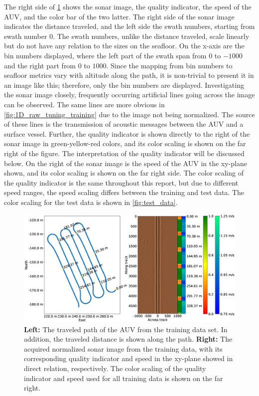 The right side of \cref{fig:path_sonar_colorbars} shows the sonar image, the quality indicator, the speed of the AUV, and the color bar of the two latter. The right side of the sonar image indicates the distance traveled, and the left side the swath numbers, starting from swath number $0$. The swath numbers, unlike the distance traveled, scale linearly but do not have any relation to the sizes on the seafloor. On the x-axis are the bin numbers displayed, where the left part of the swath span from $0$ to $-1000$ and the right part from $0$ to $1000$. Since the mapping from bin numbers to seafloor metrics vary with altitude along the path, it is non-trivial to present it in an image like this; therefore, only the bin numbers are displayed. Investigating the sonar image closely, frequently occurring artificial lines going across the image can be observed. The same lines are more obvious in \cref{fig:1D_raw_tuning_training} due to the image not being normalized. The source of these lines is the transmission of acoustic messages between the AUV and a surface vessel. Further, the quality indicator is shown directly to the right of the sonar image in green-yellow-red colors, and its color scaling is shown on the far right of the figure. The interpretation of the quality indicator will be discussed below. On the right of the sonar image is the speed of the AUV in the xy-plane shown, and its color scaling is shown on the far right side. The color scaling of the quality indicator is the same throughout this report, but due to different speed ranges, the speed scaling differs between the training and test data. The color scaling for the test data is shown in \cref{fig:test_data}. 

\begin{figure}
    \centering
    \includegraphics[trim=0cm 1.4cm 0cm 3.1cm, clip=true, width=1.0\textwidth]{figures/path_sonar_colorbars_training.eps}
    \caption{\textbf{Left:} The traveled path of the AUV from the training data set. In addition, the traveled distance is shown along the path. \textbf{Right:} The acquired normalized sonar image from the training data, with its corresponding quality indicator and speed in the xy-plane showed in direct relation, respectively. The color scaling of the quality indicator and speed used for all training data is shown on the far right.}
    \label{fig:path_sonar_colorbars}
\end{figure}

